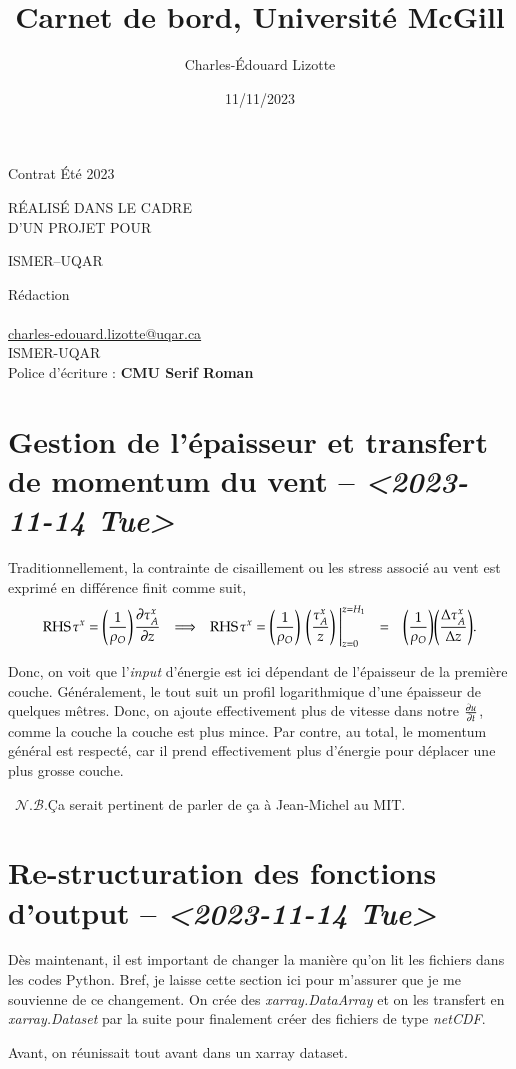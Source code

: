 \documentclass[10pt]{article}
\author{Charles-Édouard Lizotte}
\date{11/11/2023}
\title{Carnet de bord, Université McGill}
\makeatletter
\numberwithin{equation}{section}
\newcommand{\pt}{\hspace{1pt}} %
\newcommand{\nb}{\raisebox{0.8pt}{\scriptsize\textleaf}\ $\mathscr{N. B.}$\hspace{4pt}}
\newcommand{\mytitlepage}{
\begin{titlepage}
\begin{center}
{\Large Contrat Été 2023 \par}
\vspace{2cm}
{\Large \MakeUppercase{\thetitle} \par}
\vspace{2cm}
RÉALISÉ DANS LE CADRE\\ D'UN PROJET POUR \par
\vspace{2cm}
{\Large ISMER--UQAR \par}
\vspace{2cm}
{\thedate}
\end{center}
\vfill
Rédaction \\
{\theauthor}\\
\url{charles-edouard.lizotte@uqar.ca}\\
ISMER-UQAR\\
Police d'écriture : \textbf{CMU Serif Roman}
\end{titlepage}
}
\makeatother
\begin{document}
\mytitlepage
\tableofcontents\newpage

\section{Gestion de l'épaisseur et transfert de momentum du vent -- \textit{<2023-11-14 Tue>}}
\label{sec:org8b0896c}

Traditionnellement, la contrainte de cisaillement ou les stress associé au vent est exprimé en différence finit comme suit,
\begin{align}
   &&\mathrm{RHS}\pt\tau^x = \qty(\frac{1}{\rho_O})\pt\pdv{\tau_A^x}{z}
   && \Longrightarrow
   &&\mathrm{RHS}\pt\tau^x = \qty(\frac{1}{\rho_O})\pt\eval{\qty(\frac{\tau_A^x}{z})\ }_{z=0}^{z=H_1}
   && =
   &&\qty(\frac{1}{\rho_O})\qty(\frac{\Delta \tau_A^x}{\Delta z}). &&
\end{align}

Donc, on voit que l'\emph{input} d'énergie est ici dépendant de l'épaisseur de la première couche.
Généralement, le tout suit un profil logarithmique d'une épaisseur de quelques mêtres.
Donc, on ajoute effectivement plus de vitesse dans notre \(\pdv{u}{t}\), comme la couche la couche est plus mince.
Par contre, au total, le momentum général est respecté, car il prend effectivement plus d'énergie pour déplacer une plus grosse couche.\bigskip

\nb Ça serait pertinent de parler de ça à Jean-Michel au MIT. 


\section{Re-structuration des fonctions d'output -- \textit{<2023-11-14 Tue>}}
\label{sec:org9ebf897}

Dès maintenant, il est important de changer la manière qu'on lit les fichiers dans les codes Python.
Bref, je laisse cette section ici pour m'assurer que je me souvienne de ce changement.
On crée des \emph{xarray.DataArray} et on les transfert en \emph{xarray.Dataset} par la suite pour finalement créer des fichiers de type \emph{netCDF}. \bigskip

Avant, on réunissait tout avant dans un xarray dataset.


\end{document}
